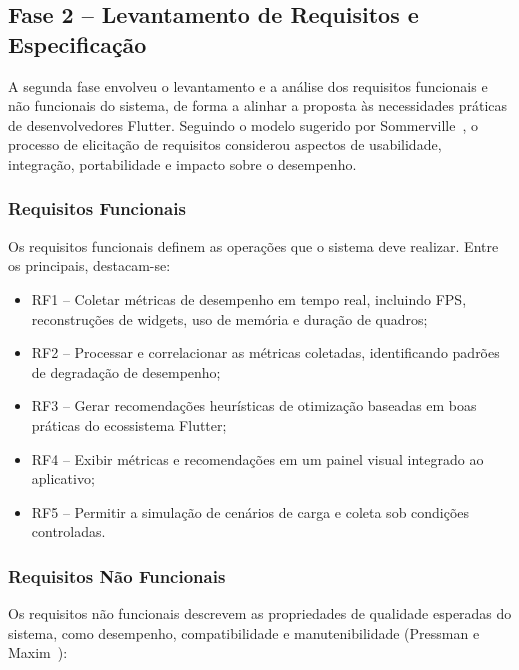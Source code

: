 
\subsection{Fase 2 – Levantamento de Requisitos e Especificação}

A segunda fase envolveu o levantamento e a análise dos requisitos funcionais e não funcionais do sistema, de forma a alinhar a proposta às necessidades práticas de desenvolvedores Flutter.
Seguindo o modelo sugerido por Sommerville~\cite{sommerville2019software}, o processo de elicitação de requisitos considerou aspectos de usabilidade, integração, portabilidade e impacto sobre o desempenho.

\subsubsection{Requisitos Funcionais}

Os requisitos funcionais definem as operações que o sistema deve realizar. Entre os principais, destacam-se:

\begin{itemize}
  \item RF1 – Coletar métricas de desempenho em tempo real, incluindo FPS, reconstruções de widgets, uso de memória e duração de quadros;
  \item RF2 – Processar e correlacionar as métricas coletadas, identificando padrões de degradação de desempenho;
  \item RF3 – Gerar recomendações heurísticas de otimização baseadas em boas práticas do ecossistema Flutter;
  \item RF4 – Exibir métricas e recomendações em um painel visual integrado ao aplicativo;
  \item RF5 – Permitir a simulação de cenários de carga e coleta sob condições controladas.
\end{itemize}

\subsubsection{Requisitos Não Funcionais}

Os requisitos não funcionais descrevem as propriedades de qualidade esperadas do sistema, como desempenho, compatibilidade e manutenibilidade (Pressman e Maxim~\cite{pressman2020engenharia}):

